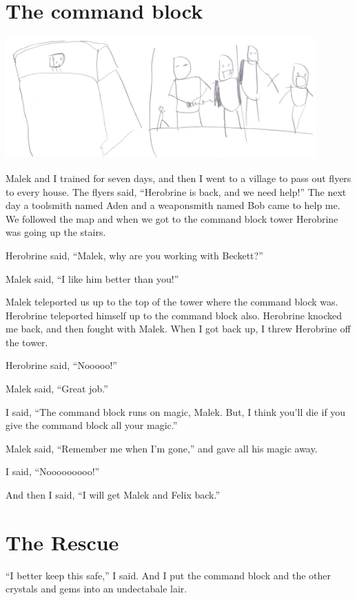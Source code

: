 \documentclass[booklet, twoside, 12pt]{krantz}
\begin{document}
\hypertarget{the-command-block}{%
\section{The command block}\label{the-command-block}}

\includegraphics[width=4.6875in,height=\textheight]{img/final-war/nooooo.jpg}

Malek and I trained for seven days, and then I went to a village to pass
out flyers to every house. The flyers said, ``Herobrine is back, and we
need help!'' The next day a toolsmith named Aden and a weaponsmith named
Bob came to help me. We followed the map and when we got to the command
block tower Herobrine was going up the stairs.

Herobrine said, ``Malek, why are you working with Beckett?''

Malek said, ``I like him better than you!''

Malek teleported us up to the top of the tower where the command block
was. Herobrine teleported himself up to the command block also.
Herobrine knocked me back, and then fought with Malek. When I got back
up, I threw Herobrine off the tower.

Herobrine said, ``Nooooo!''

Malek said, ``Great job.''

I said, ``The command block runs on magic, Malek. But, I think you'll
die if you give the command block all your magic.''

Malek said, ``Remember me when I'm gone,'' and gave all his magic away.

I said, ``Nooooooooo!''

And then I said, ``I will get Malek and Felix back.''

\hypertarget{the-rescue}{%
\section{The Rescue}\label{the-rescue}}

``I better keep this safe,'' I said. And I put the command block and the
other crystals and gems into an undectabale lair.
\end{document}
